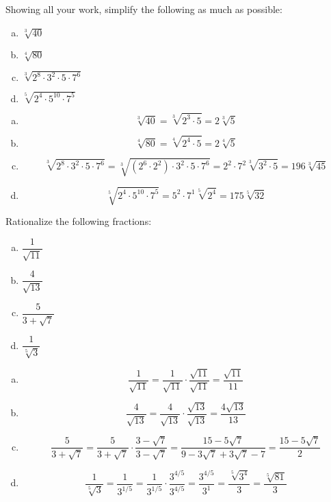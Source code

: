 \documentclass[11pt,letterpaper]{article}
\begin{document}
\newpage



 Showing all your work, simplify the following as much as possible:
        \begin{enumerate}[(a)]
        \item $\sqrt[3]{40}$
        \item $\sqrt[4]{80}$
        \item $\sqrt[3]{2^8 \cdot 3^2 \cdot 5 \cdot 7^6}$
        \item $\sqrt[5]{2^4 \cdot 5^{10} \cdot 7^5}$
        \end{enumerate} \pspace

\sol
\begin{enumerate}[(a)]
\item 
	\[
	\sqrt[3]{40}= \sqrt[3]{2^3 \cdot 5}= 2 \sqrt[3]{5}
	\] \pspace

\item 
	\[
	\sqrt[4]{80}= \sqrt[4]{2^4 \cdot 5}= 2 \sqrt[4]{5}
	\] \pspace

\item \[
	\sqrt[3]{2^8 \cdot 3^2 \cdot 5 \cdot 7^6}= \sqrt[3]{(2^6 \cdot 2^2) \cdot 3^2 \cdot 5 \cdot 7^6}= 2^2 \cdot 7^2 \sqrt[3]{3^2 \cdot 5}= 196 \sqrt[3]{45}
	\] \pspace

\item \[
	\sqrt[5]{2^4 \cdot 5^{10} \cdot 7^5}= 5^2 \cdot 7^1 \sqrt[5]{2^4}= 175 \sqrt[5]{32}
	\]
\end{enumerate}



\newpage



 Rationalize the following fractions:
        \begin{enumerate}[(a)]
        \item $\dfrac{1}{\sqrt{11}}$
        \item $\dfrac{4}{\sqrt{13}}$
        \item $\dfrac{5}{3 + \sqrt{7}}$
        \item $\dfrac{1}{\sqrt[5]{3}}$
        \end{enumerate} \pspace

\sol
\begin{enumerate}[(a)]
\item 
	\[
	\dfrac{1}{\sqrt{11}}= \dfrac{1}{\sqrt{11}} \cdot \dfrac{\sqrt{11}}{\sqrt{11}}= \dfrac{\sqrt{11}}{11}
	\] \pspace

\item 
	\[
	\dfrac{4}{\sqrt{13}}= \dfrac{4}{\sqrt{13}} \cdot \dfrac{\sqrt{13}}{\sqrt{13}}= \dfrac{4 \sqrt{13}}{13}
	\] \pspace

\item 
	\[
	\dfrac{5}{3 + \sqrt{7}}= \dfrac{5}{3 + \sqrt{7}} \cdot \dfrac{3 - \sqrt{7}}{3 - \sqrt{7}}= \dfrac{15 - 5\sqrt{7}}{9 - 3\sqrt{7} + 3\sqrt{7} - 7}= \dfrac{15 - 5\sqrt{7}}{2}
	\] \pspace

\item 
	\[
	\dfrac{1}{\sqrt[5]{3}}= \dfrac{1}{3^{1/5}}= \dfrac{1}{3^{1/5}} \cdot \dfrac{3^{4/5}}{3^{4/5}}= \dfrac{3^{4/5}}{3^1}= \dfrac{\sqrt[5]{3^4}}{3}= \dfrac{\sqrt[5]{81}}{3}
	\]
\end{enumerate}
\end{document}
